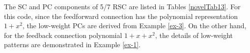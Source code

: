 \begin{example}

The SC and PC components of 5/7 RSC are listed in Tables \ref{novelTab13}. For this code, since the feedforward connection has the polynomial representation $1+x^2$, the low-weight PCs are derived from Example \ref{ex-3}. On the other hand, for the feedback connection polynomial $1+x+x^2$, the details of low-weight patterns are demonstrated in Example \ref{ex-1}.


\end{example}
